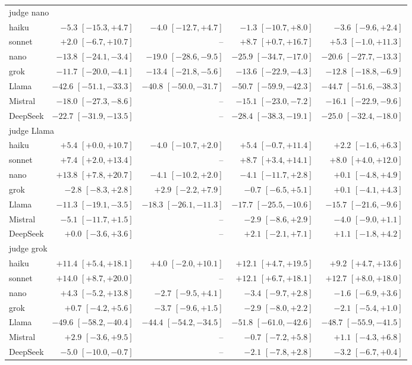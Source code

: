 \begin{tabular}{lrrrr}
\midrule
\multicolumn{5}{l}{judge nano} \\
haiku & $-5.3$ $[-15.3, +4.7]$ & $-4.0$ $[-12.7, +4.7]$ & $-1.3$ $[-10.7, +8.0]$ & $-3.6$ $[-9.6, +2.4]$ \\
sonnet & $+2.0$ $[-6.7, +10.7]$ & -- & $+8.7$ $[+0.7, +16.7]$ & $+5.3$ $[-1.0, +11.3]$ \\
nano & $-13.8$ $[-24.1, -3.4]$ & $-19.0$ $[-28.6, -9.5]$ & $-25.9$ $[-34.7, -17.0]$ & $-20.6$ $[-27.7, -13.3]$ \\
grok & $-11.7$ $[-20.0, -4.1]$ & $-13.4$ $[-21.8, -5.6]$ & $-13.6$ $[-22.9, -4.3]$ & $-12.8$ $[-18.8, -6.9]$ \\
Llama & $-42.6$ $[-51.1, -33.3]$ & $-40.8$ $[-50.0, -31.7]$ & $-50.7$ $[-59.9, -42.3]$ & $-44.7$ $[-51.6, -38.3]$ \\
Mistral & $-18.0$ $[-27.3, -8.6]$ & -- & $-15.1$ $[-23.0, -7.2]$ & $-16.1$ $[-22.9, -9.6]$ \\
DeepSeek & $-22.7$ $[-31.9, -13.5]$ & -- & $-28.4$ $[-38.3, -19.1]$ & $-25.0$ $[-32.4, -18.0]$ \\
\midrule
\multicolumn{5}{l}{judge Llama} \\
haiku & $+5.4$ $[+0.0, +10.7]$ & $-4.0$ $[-10.7, +2.0]$ & $+5.4$ $[-0.7, +11.4]$ & $+2.2$ $[-1.6, +6.3]$ \\
sonnet & $+7.4$ $[+2.0, +13.4]$ & -- & $+8.7$ $[+3.4, +14.1]$ & $+8.0$ $[+4.0, +12.0]$ \\
nano & $+13.8$ $[+7.8, +20.7]$ & $-4.1$ $[-10.2, +2.0]$ & $-4.1$ $[-11.7, +2.8]$ & $+0.1$ $[-4.8, +4.9]$ \\
grok & $-2.8$ $[-8.3, +2.8]$ & $+2.9$ $[-2.2, +7.9]$ & $-0.7$ $[-6.5, +5.1]$ & $+0.1$ $[-4.1, +4.3]$ \\
Llama & $-11.3$ $[-19.1, -3.5]$ & $-18.3$ $[-26.1, -11.3]$ & $-17.7$ $[-25.5, -10.6]$ & $-15.7$ $[-21.6, -9.6]$ \\
Mistral & $-5.1$ $[-11.7, +1.5]$ & -- & $-2.9$ $[-8.6, +2.9]$ & $-4.0$ $[-9.0, +1.1]$ \\
DeepSeek & $+0.0$ $[-3.6, +3.6]$ & -- & $+2.1$ $[-2.1, +7.1]$ & $+1.1$ $[-1.8, +4.2]$ \\
\midrule
\multicolumn{5}{l}{judge grok} \\
haiku & $+11.4$ $[+5.4, +18.1]$ & $+4.0$ $[-2.0, +10.1]$ & $+12.1$ $[+4.7, +19.5]$ & $+9.2$ $[+4.7, +13.6]$ \\
sonnet & $+14.0$ $[+8.7, +20.0]$ & -- & $+12.1$ $[+6.7, +18.1]$ & $+12.7$ $[+8.0, +18.0]$ \\
nano & $+4.3$ $[-5.2, +13.8]$ & $-2.7$ $[-9.5, +4.1]$ & $-3.4$ $[-9.7, +2.8]$ & $-1.6$ $[-6.9, +3.6]$ \\
grok & $+0.7$ $[-4.2, +5.6]$ & $-3.7$ $[-9.6, +1.5]$ & $-2.9$ $[-8.0, +2.2]$ & $-2.1$ $[-5.4, +1.0]$ \\
Llama & $-49.6$ $[-58.2, -40.4]$ & $-44.4$ $[-54.2, -34.5]$ & $-51.8$ $[-61.0, -42.6]$ & $-48.7$ $[-55.9, -41.5]$ \\
Mistral & $+2.9$ $[-3.6, +9.5]$ & -- & $-0.7$ $[-7.2, +5.8]$ & $+1.1$ $[-4.3, +6.8]$ \\
DeepSeek & $-5.0$ $[-10.0, -0.7]$ & -- & $-2.1$ $[-7.8, +2.8]$ & $-3.2$ $[-6.7, +0.4]$ \\
\bottomrule
\end{tabular}
